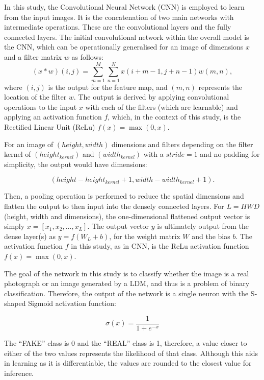 \documentclass{article}
\begin{document}
In this study, the Convolutional Neural Network (CNN)\cite{lecun2015deep,gu2018recent,li2021survey} is employed to learn from the input images. It is   
the concatenation of two main networks with intermediate operations. These are the convolutional layers and the fully connected layers. The initial convolutional network within the overall model is the CNN, which can be operationally generalised for an image of dimensions $x$ and a filter matrix $w$ as follows:
\begin{equation}
    (x * w)(i, j) = \sum_{m=1}^{M}\sum_{n=1}^{N} x(i+m-1, j+n-1)w(m,n),
\end{equation}
where $(i,j)$ is the output for the feature map, and $(m,n)$ represents the location of the filter $w$. The output is derived by applying convolutional operations to the input $x$ with each of the filters (which are learnable) and applying an activation function $f$, which, in the context of this study, is the Rectified Linear Unit (ReLu) $f(x) = \max(0, x)$. 

For an image of $(height, width)$ dimensions and filters depending on the filter kernel of $(height_{kernel})$ and $(width_{kernel})$ with a $stride = 1$ and no padding for simplicity, the output would have dimensions:

\begin{equation}
    (height - height_{kernel} + 1, width - width_{kernel} + 1).
\end{equation}

\noindent Then, a pooling operation is performed to reduce the spatial dimensions and flatten the output to then input into the densely connected layers. For $L = HWD$ (height, width and dimensions), the one-dimensional flattened output vector is simply $x = [x_1, x_2, ..., x_L]$. The output vector $y$ is ultimately output from the dense layer(s) as $y = f(W_{L}+ b)$, for the weight matrix $W$ and the bias $b$. The activation function $f$ in this study, as in CNN, is the ReLu activation function $f(x) = \max(0, x)$. 

The goal of the network in this study is to classify whether the image is a real photograph or an image generated by a LDM, and thus is a problem of binary classification. Therefore, the output of the network is a single neuron with the S-shaped Sigmoid activation function:

\begin{equation}
\sigma(x) = \frac{1}{1+e^{-x}} 
\end{equation}

The ``FAKE'' class is 0 and the ``REAL'' class is 1, therefore, a value closer to either of the two values represents the likelihood of that class. Although this aids in learning as it is differentiable, the values are rounded to the closest value for inference. 
\end{document}
